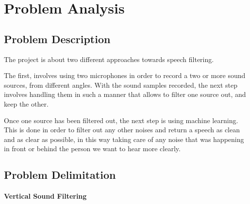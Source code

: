 \chapter{Problem Analysis}\label{ch:problemAnalysis}
\section{Problem Description}
The project is about two different approaches towards speech filtering.

The first, involves using two microphones in order to record a two or 
more sound sources, from different angles.
With the sound samples recorded, the next step involves handling them 
in such a manner that allows to filter one source out, and keep the other.

Once one source has been filtered out, the next step is using machine learning.
This is done in order to filter out any other noises and return a speech as clean
and as clear as possible, in this way taking care of any noise that was happening 
in front or behind the person we want to hear more clearly.
\section{Problem Delimitation}
\subsubsection{Vertical Sound Filtering}
